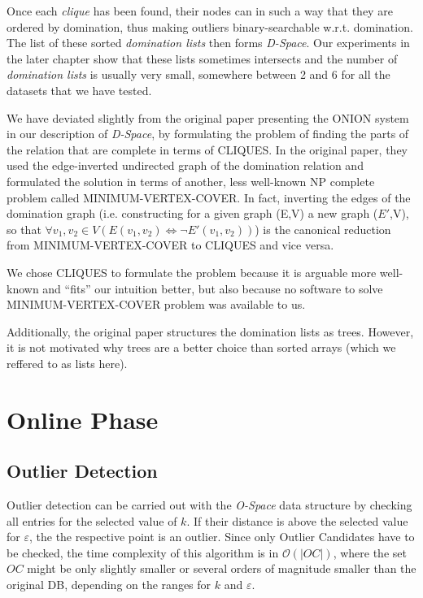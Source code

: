 \documentclass[runningheads]{llncs}
\begin{document}
Once each \emph{clique} has been found, their nodes can in such a way that they are ordered by domination, thus making outliers binary-searchable w.r.t. domination. The list of these sorted \emph{domination lists} then forms \emph{D-Space}. Our experiments in the later chapter show that these lists sometimes intersects and the number of \emph{domination lists} is usually very small, somewhere between 2 and 6 for all the datasets that we have tested.

We have deviated slightly from the original paper presenting the ONION system\cite{onion} in our description of \emph{D-Space}, by formulating the problem of finding the parts of the relation that are complete in terms of CLIQUES. In the original paper, they used the edge-inverted undirected graph of the domination relation and formulated the solution in terms of another, less well-known NP complete problem called MINIMUM-VERTEX-COVER. In fact, inverting the edges of the domination graph (i.e. constructing for a given graph (E,V) a new graph ($E'$,V), so that $\forall v_1,v_2\in V(E(v_1,v_2) \iff \neg E'(v_1,v_2))$) is the canonical\cite{cormen} reduction from MINIMUM-VERTEX-COVER to CLIQUES and vice versa.

We chose CLIQUES to formulate the problem because it is arguable more well-known  and ``fits'' our intuition better, but also because no software to solve MINIMUM-VERTEX-COVER problem was available to us.

Additionally, the original paper structures the domination lists as trees. However, it is not motivated why trees are a better choice than sorted arrays (which we reffered to as lists here).

\section{Online Phase}
\subsection{Outlier Detection}

Outlier detection can be carried out with the \emph{O-Space} data structure by checking all entries for the selected value of $k$. If their distance is above the selected value for $\varepsilon$, the the respective point is an outlier. Since only Outlier Candidates have to be checked, the time complexity of this algorithm is in $\mathcal{O}(|OC|)$, where the set $OC$ might be only slightly smaller or several orders of magnitude smaller than the original DB, depending on the ranges for $k$ and $\varepsilon$.
\end{document}
